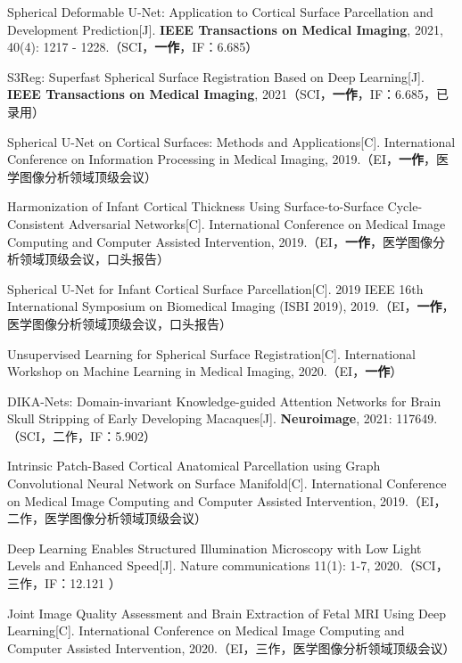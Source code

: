 \cleardoublepage
{}


\noindent [1] Spherical Deformable U-Net: Application to Cortical Surface Parcellation and Development Prediction[J]. \textbf{IEEE Transactions on Medical Imaging}, 2021, 40(4): 1217 - 1228.（SCI，\textbf{一作}，IF：6.685）

\noindent [2] S3Reg: Superfast Spherical Surface Registration Based on Deep Learning[J]. \textbf{IEEE Transactions on Medical Imaging}, 2021（SCI，\textbf{一作}，IF：6.685，已录用）

\noindent [3] Spherical U-Net on Cortical Surfaces: Methods and Applications[C]. International Conference on Information Processing in Medical Imaging, 2019.（EI，\textbf{一作}，医学图像分析领域顶级会议）

\noindent [4] Harmonization of Infant Cortical Thickness Using Surface-to-Surface Cycle-Consistent Adversarial Networks[C]. International Conference on Medical Image Computing and Computer Assisted Intervention, 2019.（EI，\textbf{一作}，医学图像分析领域顶级会议，口头报告）

\noindent [5] Spherical U-Net for Infant Cortical Surface Parcellation[C]. 2019 IEEE 16th International Symposium on Biomedical Imaging (ISBI 2019), 2019.（EI，\textbf{一作}，医学图像分析领域顶级会议，口头报告）

\noindent [6] Unsupervised Learning for Spherical Surface Registration[C]. International Workshop on Machine Learning in Medical Imaging, 2020.（EI，\textbf{一作}）

\noindent [7] DIKA-Nets: Domain-invariant Knowledge-guided Attention Networks for Brain Skull Stripping of Early Developing Macaques[J]. \textbf{Neuroimage}, 2021: 117649.（SCI，二作，IF：5.902） 

\noindent [8] Intrinsic Patch-Based Cortical Anatomical Parcellation using Graph Convolutional Neural Network on Surface Manifold[C]. International Conference on Medical Image Computing and Computer Assisted Intervention, 2019.（EI，二作，医学图像分析领域顶级会议）

\noindent [9] Deep Learning Enables Structured Illumination Microscopy with Low Light Levels and Enhanced Speed[J]. Nature communications 11(1): 1-7, 2020.（SCI，三作，IF：12.121 ）

\noindent [10] Joint Image Quality Assessment and Brain Extraction of Fetal MRI Using Deep Learning[C]. International Conference on Medical Image Computing and Computer Assisted Intervention, 2020.（EI，三作，医学图像分析领域顶级会议）

